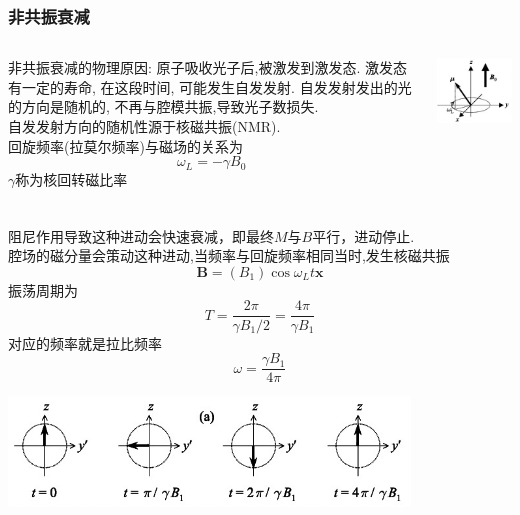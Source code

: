 \begin{frame} 
\frametitle{非共振衰减}
\begin{columns}[T,onlytextwidth]
{\Bullet} 非共振衰减的物理原因: 原子吸收光子后,被激发到激发态. 激发态有一定的寿命, 在这段时间, 可能发生自发发射. 自发发射发出的光的方向是随机的, 不再与腔模共振,导致光子数损失. \\  {\vspace*{1.3em}}
自发发射方向的随机性源于核磁共振(NMR). \\ {\vspace*{1.3em}}
回旋频率(拉莫尔频率)与磁场的关系为
\[ \omega_L = -\gamma B_0\]
$\gamma$称为核回转磁比率
\begin{center}
 \includegraphics[width=1.0\textwidth]{figs/2022-05-25-11-08-06.png}
\end{center}
\end{columns}
\end{frame}

\begin{frame} 
\frametitle{}
阻尼作用导致这种进动会快速衰减，即最终$M$与$B$平行，进动停止. \\ 腔场的磁分量会策动这种进动,当频率与回旋频率相同当时,发生核磁共振
\[ \mathbf{B}= (B_1)\cos \omega _L t \mathbf{x}\] 
振荡周期为 
\[T = \frac{2\pi}{\gamma B_1 /2} = \frac{4\pi}{\gamma B_1} \] 
对应的频率就是拉比频率
\[ \omega = \frac{\gamma B_1}{4\pi} \]  
  \begin{center}
       \includegraphics[width=0.8\textwidth]{figs/2022-05-25-11-22-35.png}
  \end{center}
\end{frame}


